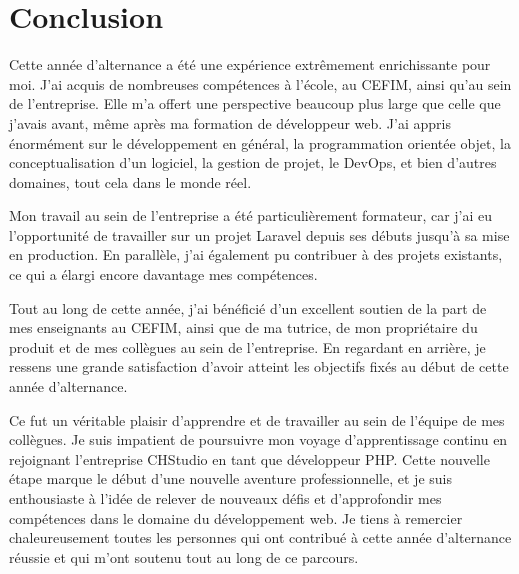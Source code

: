 \chapter{Conclusion}\label{ch:conclusion}

Cette année d'alternance a été une expérience extrêmement enrichissante pour moi. J'ai acquis de nombreuses compétences à l'école, au CEFIM, ainsi qu'au sein de l'entreprise. Elle m'a offert une perspective beaucoup plus large que celle que j'avais avant, même après ma formation de développeur web. J'ai appris énormément sur le développement en général, la programmation orientée objet, la conceptualisation d'un logiciel, la gestion de projet, le DevOps, et bien d'autres domaines, tout cela dans le monde réel.

Mon travail au sein de l'entreprise a été particulièrement formateur, car j'ai eu l'opportunité de travailler sur un projet Laravel depuis ses débuts jusqu'à sa mise en production. En parallèle, j'ai également pu contribuer à des projets existants, ce qui a élargi encore davantage mes compétences.

Tout au long de cette année, j'ai bénéficié d'un excellent soutien de la part de mes enseignants au CEFIM, ainsi que de ma tutrice, de mon propriétaire du produit et de mes collègues au sein de l'entreprise. En regardant en arrière, je ressens une grande satisfaction d'avoir atteint les objectifs fixés au début de cette année d'alternance.

Ce fut un véritable plaisir d'apprendre et de travailler au sein de l'équipe de mes collègues. Je suis impatient de poursuivre mon voyage d'apprentissage continu en rejoignant l'entreprise CHStudio en tant que développeur PHP. Cette nouvelle étape marque le début d'une nouvelle aventure professionnelle, et je suis enthousiaste à l'idée de relever de nouveaux défis et d'approfondir mes compétences dans le domaine du développement web. Je tiens à remercier chaleureusement toutes les personnes qui ont contribué à cette année d'alternance réussie et qui m'ont soutenu tout au long de ce parcours.
